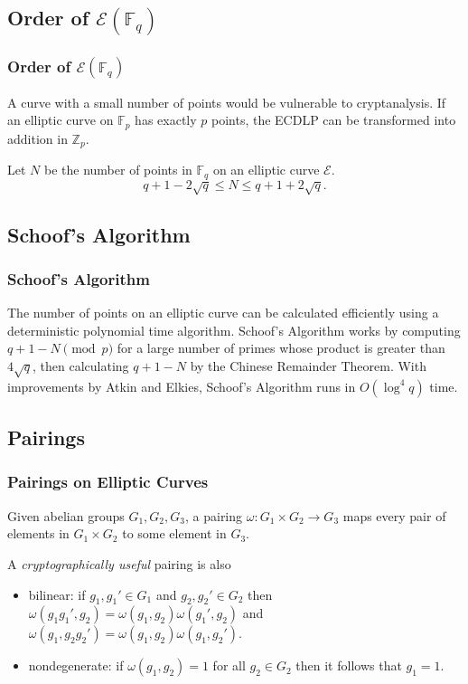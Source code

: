 \documentclass{beamer}
\begin{document}
    \subsection{Order of \(\mathcal{E}(\mathbb{F}_q)\)}
    \begin{frame}
        \frametitle{Order of \(\mathcal{E}(\mathbb{F}_q)\)}
        A curve with a small number of points would be vulnerable to
        cryptanalysis.
        \vfill
        If an elliptic curve on \(\mathbb{F}_p\) has exactly \(p\) points,
        the ECDLP can be transformed into addition in \(\mathbb{Z}_p\).
        \vfill
        \begin{definition}
            Let \(N\) be the number of points in \(\mathbb{F}_q\)
            on an elliptic curve \(\mathcal{E}\).
            \[q + 1 - 2\sqrt{q} \leq N \leq q + 1 + 2\sqrt{q}.\]
        \end{definition}
    \end{frame}

    \subsection{Schoof's Algorithm}
    \begin{frame}
        \frametitle{Schoof's Algorithm}
        The number of points on an elliptic curve can be calculated
        efficiently using a deterministic polynomial time algorithm.
        \vfill
        Schoof's Algorithm works by computing \(q + 1 - N \pmod p\) for
        a large number of primes whose product is greater than \(4\sqrt{q}\),
        then calculating \(q + 1 - N\) by the Chinese Remainder Theorem.
        \vfill
        With improvements by Atkin and Elkies, Schoof's Algorithm
        runs in \(O(\log^4 q)\) time.
    \end{frame}

    \subsection{Pairings}
    \begin{frame}
        \frametitle{Pairings on Elliptic Curves}
        \begin{definition}
            Given abelian groups \(G_1, G_2, G_3\), a pairing
            \(\omega: G_1 \times G_2 \to G_3\) maps every pair of elements
            in \(G_1 \times G_2\) to some element in \(G_3\).
        \end{definition}
        \vfill
        A \emph{cryptographically useful} pairing is also
        \begin{itemize}
            \item bilinear: if \(g_1, g_1' \in G_1\)
                and \(g_2, g_2' \in G_2\)
                then \(\omega(g_1g_1', g_2) =
                \omega(g_1, g_2)\omega(g_1', g_2)\)
                and \(\omega(g_1, g_2g_2') =
                \omega(g_1, g_2)\omega(g_1, g_2')\).
            \item nondegenerate: if \(\omega(g_1, g_2) = 1\)
                for all \(g_2 \in G_2\) then it follows that \(g_1 = 1\).
        \end{itemize}
    \end{frame}
\end{document}

